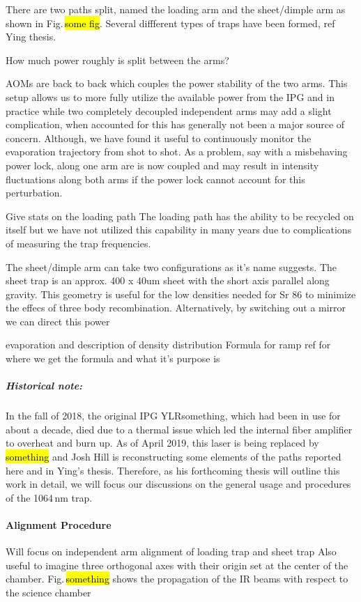 There are two paths split, named the loading arm and the sheet/dimple arm as shown in Fig.\,\hl{some fig}.
Several diffferent types of traps have been formed, ref Ying thesis. 

How much power roughly is split between the arms?

AOMs are back to back which couples the power stability of the two arms. 
This setup allows us to more fully utilize the available power from the IPG and in practice while two completely decoupled independent arms may add a slight complication, when accounted for this has generally not been a major source of concern. 
Although, we have found it useful to continuously monitor the evaporation trajectory from shot to shot. 
As a problem, say with a misbehaving power lock, along one arm are is now coupled and may result in intensity fluctuations along both arms if the power lock cannot account for this perturbation.

Give stats on the loading path The loading path has the ability to be recycled on itself but we have not utilized this capability in many years due to complications of measuring the trap frequencies. 

The sheet/dimple arm can take two configurations as it's name suggests. The sheet trap is an approx. 400 x 40um sheet with the short axis parallel along gravity. This geometry is useful for the low densities needed for Sr 86 to minimize the effecs of three body recombination. Alternatively, by switching out a mirror we can direct this power

evaporation and description of density distribution
Formula for ramp
ref for where we get the formula and what it's purpose is

\subparagraph{Historical note:}
In the fall of 2018, the original IPG YLRsomething, which had been in use for about a decade, died due to a thermal issue which led the internal fiber amplifier to overheat and burn up.
As of April 2019, this laser is being replaced by \hl{something} and Josh Hill is reconstructing some elements of the paths reported here and in Ying's thesis.
Therefore, as his forthcoming thesis will outline this work in detail, we will focus our discussions on the general usage and procedures of the 1064\,nm trap.


\paragraph{Alignment Procedure} \label{sssec:1064_align}
Will focus on independent arm alignment of loading trap and sheet trap
Also useful to imagine three orthogonal axes with their origin set at the center of the chamber.
Fig.\,\hl{something} shows the propagation of the IR beams with respect to the science chamber


